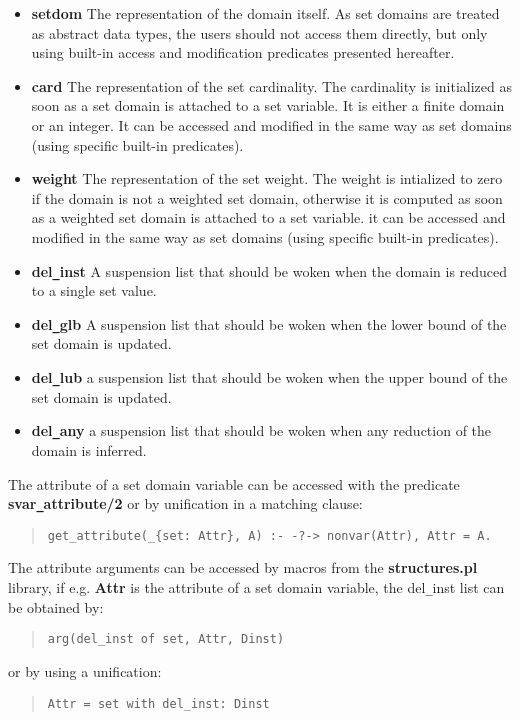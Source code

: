 \begin{itemize}
\item {\bf setdom} The representation of the domain itself. As set
domains are treated as abstract data types, the users should not
access them directly, but only using built-in access and modification
predicates presented hereafter.
\item {\bf card} The representation of the set cardinality. The
cardinality is initialized as soon as a set domain is attached to
a set variable. It is either a finite domain or an integer. It can
be accessed and modified in the same way as set domains (using
specific built-in predicates).
\item {\bf weight} The representation of the set weight. The weight is
intialized to zero if the domain is not a weighted set domain, otherwise it
is computed as soon as a weighted set domain is attached to a set
variable. it can be accessed and modified in the same way as set
domains (using specific built-in predicates).
\item {\bf del\verb/_/inst} A suspension list that should be woken
when the domain is reduced to a single set value.
\item {\bf del\verb/_/glb} A suspension list that should be woken when
the lower bound of the set domain is updated.
\item {\bf del\verb/_/lub} a suspension list that should be woken when
the upper bound of the set domain is updated.
\item {\bf del\verb/_/any} a suspension list that should be woken when
any reduction of the domain is inferred.
\end{itemize}

\noindent
The attribute of a set domain variable can be accessed with the
predicate {\bf svar\verb/_/attribute/2} or by unification
in a matching clause:
\begin{quote}\begin{verbatim}
get_attribute(_{set: Attr}, A) :- -?-> nonvar(Attr), Attr = A.
\end{verbatim}\end{quote}
The attribute arguments can be accessed by macros from the \eclipse
{\bf structures.pl} library, if e.g. {\bf Attr} is the attribute of a
set domain variable, the del\verb/_/inst list can be obtained by:
\begin{quote}\begin{verbatim}
arg(del_inst of set, Attr, Dinst)
\end{verbatim}\end{quote}
or by using a unification: 
\begin{quote}\begin{verbatim}
Attr = set with del_inst: Dinst
\end{verbatim}\end{quote}


